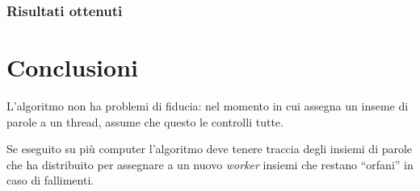 \documentclass[]{myarticle}
\begin{document}

\subsubsection{Risultati ottenuti}


\section{Conclusioni}

L'algoritmo non ha problemi di fiducia: nel momento in cui assegna un inseme di parole a un thread, assume che questo le controlli tutte.

Se eseguito su pi\`u computer l'algoritmo deve tenere traccia degli insiemi di parole che ha distribuito per assegnare a un nuovo \emph{worker} insiemi che restano ``orfani'' in caso di fallimenti.

\renewcommand{\refname}{Riferimenti}
\nocite{*}
\printbibliography
\end{document}
